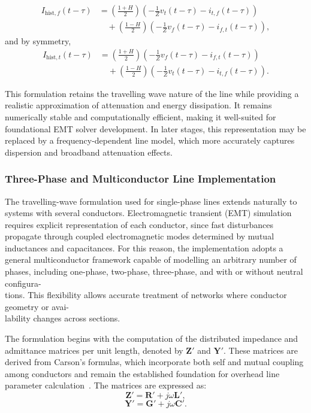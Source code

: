\begin{equation}
\begin{aligned}
    I_{\mathrm{hist},f}(t-\tau)
    &= \left(\frac{1+H}{2}\right)
       \left(-\frac{1}{Z}v_t(t-\tau)-i_{t,f}(t-\tau)\right) \\
    &\quad + \left(\frac{1-H}{2}\right)
       \left(-\frac{1}{Z}v_f(t-\tau)-i_{f,t}(t-\tau)\right),
\end{aligned}
\end{equation}
and by symmetry,
\begin{equation}
\begin{aligned}
    I_{\mathrm{hist},t}(t-\tau)
    &= \left(\frac{1+H}{2}\right)
       \left(-\frac{1}{Z}v_f(t-\tau)-i_{f,t}(t-\tau)\right) \\
    &\quad + \left(\frac{1-H}{2}\right)
       \left(-\frac{1}{Z}v_t(t-\tau)-i_{t,f}(t-\tau)\right).
\end{aligned}
\end{equation}

This formulation retains the travelling wave nature of the line while providing a realistic approximation of 
attenuation and energy dissipation. It remains numerically stable and computationally efficient, making it well-suited for 
foundational EMT solver development. In later stages, this representation may be replaced by a frequency-dependent line model, 
which more accurately captures dispersion and broadband attenuation effects.

\subsubsection{Three-Phase and Multiconductor Line Implementation}

The travelling-wave formulation used for single-phase lines extends naturally to systems with several conductors. 
Electromagnetic transient (EMT) simulation requires explicit representation of each conductor, since fast disturbances propagate through 
coupled electromagnetic modes determined by mutual inductances and capacitances. For this reason, the implementation adopts a general 
multiconductor framework capable of modelling an arbitrary number of phases, including one-phase, two-phase, three-phase, and 
 with or without neutral configura-\\tions. This flexibility allows accurate treatment of networks where conductor geometry or avai-\\lability 
 changes across sections.

The formulation begins with the computation of the distributed impedance and admittance matrices per unit length, denoted by $\bm{Z}'$ and 
$\bm{Y}'$. These matrices are derived from Carson's formulas, which incorporate both self and mutual coupling among conductors and 
remain the established foundation for overhead line parameter calculation~\cite{carson1926}. The matrices are expressed as:
\begin{equation}
    \bm{Z}' = \bm{R}' + j \omega \bm{L}',
\end{equation}
\begin{equation}
    \bm{Y}' = \bm{G}' + j \omega \bm{C}'.
\end{equation}

